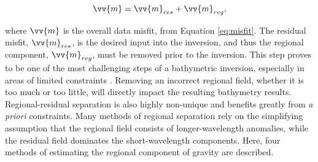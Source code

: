 \begin{equation} \label{eq:regional_residual}
    \vv{m} = \vv{m}_{res} + \vv{m}_{reg},
\end{equation}

\noindent
where $\vv{m}$ is the overall data misfit, from Equation \ref{eq:misfit}. The residual misfit, $\vv{m}_{res}$, is the desired input into the inversion, and thus the regional component, $\vv{m}_{reg}$, must be removed prior to the inversion. This step proves to be one of the most challenging steps of a bathymetric inversion, especially in areas of limited constraints \citep{brisbourneseabed2014}. Removing an incorrect regional field, whether it is too much or too little, will directly impact the resulting bathymetry results. Regional-residual separation is also highly non-unique and benefits greatly from \textit{a priori} constraints. Many methods of regional separation rely on the simplifying assumption that the regional field consists of longer-wavelength anomalies, while the residual field dominates the short-wavelength components. Here, four methods of estimating the regional component of gravity are described.

